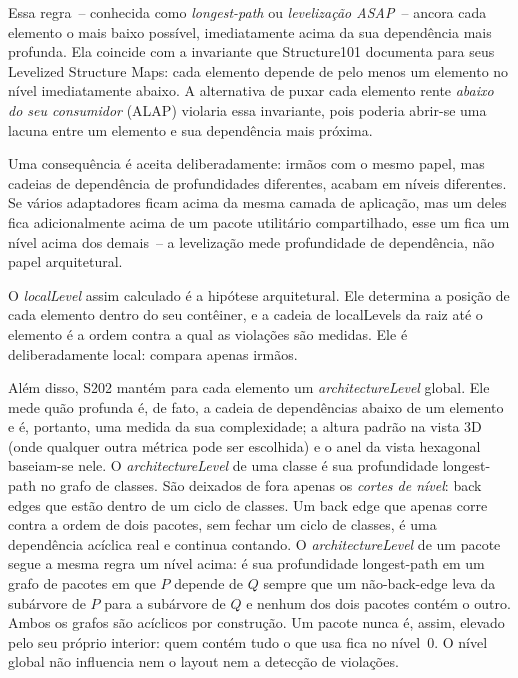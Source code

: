 \documentclass[a4paper,11pt]{article}
\begin{document}
Essa regra~-- conhecida como \emph{longest-path} ou \emph{leveliza\c{c}\~ao
ASAP}~-- ancora cada elemento o mais baixo poss\'ivel, imediatamente acima da
sua depend\^encia mais profunda. Ela coincide com a invariante que Structure101
documenta para seus Levelized Structure Maps: cada elemento depende de pelo
menos um elemento no n\'ivel imediatamente abaixo. A alternativa de puxar cada
elemento rente \emph{abaixo do seu consumidor} (ALAP) violaria essa
invariante, pois poderia abrir-se uma lacuna entre um elemento e sua
depend\^encia mais pr\'oxima.

Uma consequ\^encia \'e aceita deliberadamente: irm\~aos com o mesmo papel, mas
cadeias de depend\^encia de profundidades diferentes, acabam em n\'iveis
diferentes. Se v\'arios adaptadores ficam acima da mesma camada de
aplica\c{c}\~ao, mas um deles fica adicionalmente acima de um pacote utilit\'ario
compartilhado, esse um fica um n\'ivel acima dos demais~-- a leveliza\c{c}\~ao
mede profundidade de depend\^encia, n\~ao papel arquitetural.

O \emph{localLevel} assim calculado \'e a hip\'otese arquitetural. Ele
determina a posi\c{c}\~ao de cada elemento dentro do seu cont\^einer, e a
cadeia de localLevels da raiz at\'e o elemento \'e a ordem contra a qual as
viola\c{c}\~oes s\~ao medidas. Ele \'e deliberadamente local: compara apenas
irm\~aos.

Al\'em disso, S202 mant\'em para cada elemento um \emph{architectureLevel}
global. Ele mede qu\~ao profunda \'e, de fato, a cadeia de depend\^encias abaixo
de um elemento e \'e, portanto, uma medida da sua complexidade; a altura padr\~ao
na vista 3D (onde qualquer outra m\'etrica pode ser escolhida) e o anel da
vista hexagonal baseiam-se nele. O
\emph{architectureLevel} de uma classe \'e sua profundidade longest-path no
grafo de classes. S\~ao deixados de fora apenas os \emph{cortes de n\'ivel}:
back edges que est\~ao dentro de um ciclo de classes. Um back edge que apenas
corre contra a ordem de dois pacotes, sem fechar um ciclo de classes, \'e uma
depend\^encia ac\'iclica real e continua contando. O \emph{architectureLevel}
de um pacote segue a mesma regra um n\'ivel acima: \'e sua profundidade
longest-path em um grafo de pacotes em que $P$ depende de $Q$ sempre que um
n\~ao-back-edge leva da sub\'arvore de $P$ para a sub\'arvore de $Q$ e nenhum
dos dois pacotes cont\'em o outro. Ambos os grafos s\~ao ac\'iclicos por
constru\c{c}\~ao. Um pacote nunca \'e, assim, elevado pelo seu pr\'oprio
interior: quem cont\'em tudo o que usa fica no n\'ivel~0. O n\'ivel global n\~ao
influencia nem o layout nem a detec\c{c}\~ao de viola\c{c}\~oes.
\end{document}
